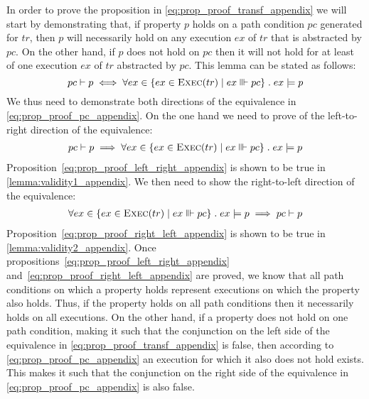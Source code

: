\begin{pf}
In order to prove the proposition in \cref{eq:prop_proof_transf_appendix} we will start by demonstrating that,
if property $p$ holds on a path condition $pc$ generated for $tr$,
then $p$ will necessarily hold on any execution $ex$ of $tr$ that is abstracted by $pc$. On the other hand, if $p$ does not hold on $pc$ then it will not hold for at least of one execution $ex$ of $tr$ abstracted by $pc$. This lemma can be stated as follows:
\begin{equation}
\label{eq:prop_proof_pc_appendix}
pc\vdash p \;\Longleftrightarrow \;\forall ex\in\{ex\in\textsc{Exec}(tr)\;|\;ex\Vvdash pc\}\;.\; ex\models p
\end{equation}
We thus need to demonstrate both directions of the equivalence in \cref{eq:prop_proof_pc_appendix}. On the one hand we need to prove of the left-to-right direction of the equivalence:
\begin{multline}
\label{eq:prop_proof_left_right_appendix}
pc\vdash p \;\Longrightarrow \;\forall ex\in\{ex\in\textsc{Exec}(tr)\;|\;ex\Vvdash pc\}\;.\; ex\models p
\end{multline}
Proposition~\ref{eq:prop_proof_left_right_appendix} is shown to be true in \cref{lemma:validity1_appendix}.
We then need to show the right-to-left direction of the equivalence:
\begin{multline}
\label{eq:prop_proof_right_left_appendix}
\forall ex\in\{ex\in\textsc{Exec}(tr)\;|\;ex\Vvdash pc\}\;.\; ex\models p \;\Longrightarrow \;pc\vdash p 
\end{multline}
Proposition~\ref{eq:prop_proof_right_left_appendix} is shown to be true in \cref{lemma:validity2_appendix}.
Once propositions~\ref{eq:prop_proof_left_right_appendix} and~\ref{eq:prop_proof_right_left_appendix} are proved, we know that all path conditions on which a property holds represent executions on which the property also holds. Thus, if the property holds on all path conditions then it necessarily holds on all executions. On the other hand, if a property does not hold on one path condition, making it such that the conjunction on the left side of the equivalence in \cref{eq:prop_proof_transf_appendix} is false, then according to \cref{eq:prop_proof_pc_appendix} an execution for which it also does not hold exists. This makes it such that the conjunction on the right side of the equivalence in \cref{eq:prop_proof_pc_appendix} is also false.
\end{pf}

